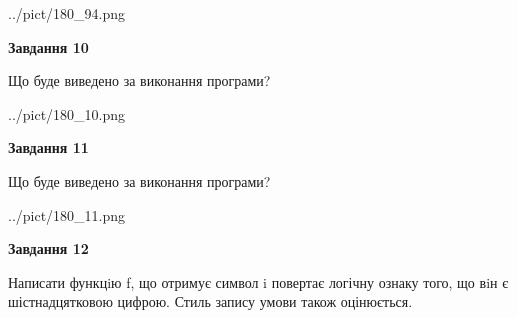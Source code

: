 \documentclass[12pt, ukrainian]{article}
\begin{document}
{\begin {large}
\begin{center}
	{../pict/180_94.png}
\end{center}
\newpage

{\begin {center}\textbf{Завдання 10}\end {center}}

Що буде виведено за виконання програми?\par
\begin{center}
	{../pict/180_10.png}
\end{center}
\newpage

{\begin {center}\textbf{Завдання 11}\end {center}}

Що буде виведено за виконання програми?\par
\begin{center}
	{../pict/180_11.png}
\end{center}
\newpage

{\begin {center}\textbf{Завдання 12}\end {center}}


Написати функцiю f, що отримує символ i повертає логічну ознаку того, що вiн є шістнадцятковою цифрою. Стиль запису умови також оцінюється.\par
\newpage

\end {large}}
\end{document}
